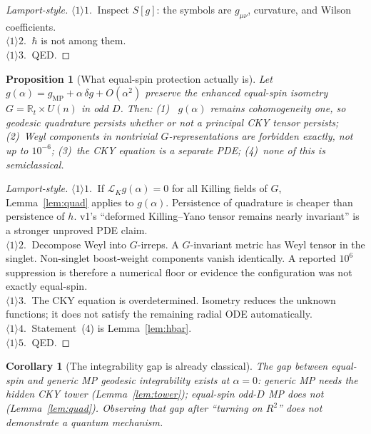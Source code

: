 \documentclass[11pt,a4paper]{article}
\newtheorem{proposition}{Proposition}[section]
\newtheorem{corollary}{Corollary}[section]
\begin{document}
\begin{proof}[Lamport-style]
\(\langle1\rangle1.\ \) Inspect \(S[g]\): the symbols are \(g_{\mu\nu}\),
curvature, and Wilson coefficients.\\
\(\langle1\rangle2.\ \) \(\hbar\) is not among them.\\
\(\langle1\rangle3.\ \) QED.
\end{proof}

\begin{proposition}[What equal-spin protection actually is]
\label{prop:protect}
Let \(g(\alpha)=g_{\mathrm{MP}}+\alpha\,\delta g+O(\alpha^2)\) preserve
the enhanced equal-spin isometry \(G=\mathbb{R}_t\times U(n)\) in odd
\(D\). Then: (1)~ \(g(\alpha)\) remains cohomogeneity one, so geodesic
quadrature persists whether or not a principal CKY tensor persists;
(2)~Weyl components in nontrivial \(G\)-representations are forbidden
exactly, not up to \(10^{-6}\); (3)~the CKY equation is a separate PDE;
(4)~none of this is semiclassical.
\end{proposition}

\begin{proof}[Lamport-style]
\(\langle1\rangle1.\ \) If \(\mathcal{L}_K g(\alpha)=0\) for all Killing
fields of \(G\), Lemma~\ref{lem:quad} applies to \(g(\alpha)\).
Persistence of quadrature is cheaper than persistence of \(h\). v1's
``deformed Killing--Yano tensor remains nearly invariant'' is a
stronger unproved PDE claim.\\
\(\langle1\rangle2.\ \) Decompose Weyl into \(G\)-irreps. A \(G\)-invariant
metric has Weyl tensor in the singlet. Non-singlet boost-weight
components vanish identically. A reported \(10^6\) suppression is
therefore a numerical floor or evidence the configuration was not
exactly equal-spin.\\
\(\langle1\rangle3.\ \) The CKY equation is overdetermined. Isometry
reduces the unknown functions; it does not satisfy the remaining radial
ODE automatically.\\
\(\langle1\rangle4.\ \) Statement~(4) is Lemma~\ref{lem:hbar}.\\
\(\langle1\rangle5.\ \) QED.
\end{proof}

\begin{corollary}[The integrability gap is already classical]
The gap between equal-spin and generic MP geodesic integrability exists
at \(\alpha=0\): generic MP needs the hidden CKY tower
(Lemma~\ref{lem:tower}); equal-spin odd-\(D\) MP does not
(Lemma~\ref{lem:quad}). Observing that gap after ``turning on \(R^2\)''
does not demonstrate a quantum mechanism.
\end{corollary}
\end{document}
